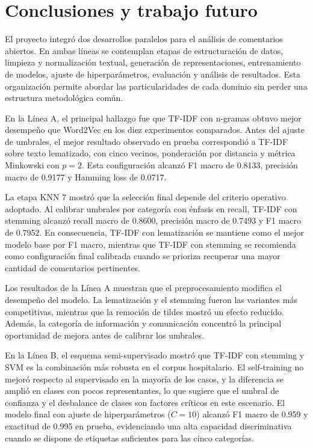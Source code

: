 \documentclass[12pt,a4paper]{article}
\begin{document}
\section{Conclusiones y trabajo futuro}

El proyecto integró dos desarrollos paralelos para el análisis de comentarios abiertos. En ambas líneas se contemplan etapas de estructuración de datos, limpieza y normalización textual, generación de representaciones, entrenamiento de modelos, ajuste de hiperparámetros, evaluación y análisis de resultados. Esta organización permite abordar las particularidades de cada dominio sin perder una estructura metodológica común.

En la Línea A, el principal hallazgo fue que TF-IDF con n-gramas obtuvo mejor desempeño que Word2Vec en los diez experimentos comparados. Antes del ajuste de umbrales, el mejor resultado observado en prueba correspondió a TF-IDF sobre texto lematizado, con cinco vecinos, ponderación por distancia y métrica Minkowski con $p=2$. Esta configuración alcanzó F1 macro de 0.8133, precisión macro de 0.9177 y Hamming loss de 0.0717.

La etapa KNN 7 mostró que la selección final depende del criterio operativo adoptado. Al calibrar umbrales por categoría con énfasis en recall, TF-IDF con stemming alcanzó recall macro de 0.8600, precisión macro de 0.7493 y F1 macro de 0.7952. En consecuencia, TF-IDF con lematización se mantiene como el mejor modelo base por F1 macro, mientras que TF-IDF con stemming se recomienda como configuración final calibrada cuando se prioriza recuperar una mayor cantidad de comentarios pertinentes.

Los resultados de la Línea A muestran que el preprocesamiento modifica el desempeño del modelo. La lematización y el stemming fueron las variantes más competitivas, mientras que la remoción de tildes mostró un efecto reducido. Además, la categoría de información y comunicación concentró la principal oportunidad de mejora antes de calibrar los umbrales.

En la Línea B, el esquema semi-supervisado mostró que TF-IDF con stemming y SVM es la combinación más robusta en el corpus hospitalario. El self-training no mejoró respecto al supervisado en la mayoría de los casos, y la diferencia se amplió en clases con pocos representantes, lo que sugiere que el umbral de confianza y el desbalance de clases son factores críticos en este escenario. El modelo final con ajuste de hiperparámetros ($C=10$) alcanzó F1 macro de 0.959 y exactitud de 0.995 en prueba, evidenciando una alta capacidad discriminativa cuando se dispone de etiquetas suficientes para las cinco categorías.
\end{document}
